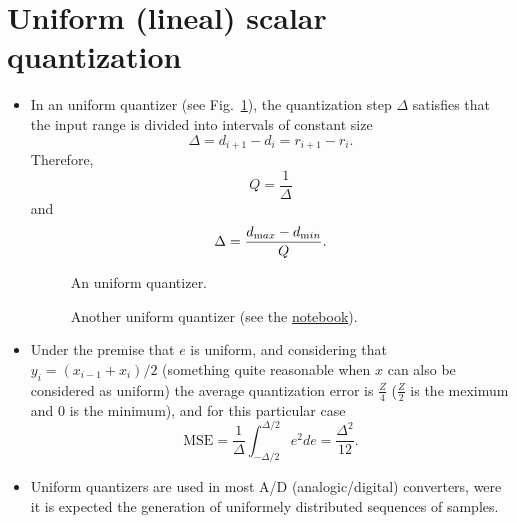 \section{Uniform (lineal) scalar quantization}
\begin{itemize}

\item
  In an uniform quantizer (see Fig.~\ref{fig:cuantif}), the
  quantization step \(\Delta\) satisfies that the input range is
  divided into intervals of constant size
  \begin{equation}
    \Delta=d_{i+1}-d_i=r_{i+1}-r_i.
  \end{equation}
  Therefore,
  \begin{equation}
    Q=\frac{1}{\Delta}
  \end{equation}
  and
  \begin{equation}
    \Delta=\frac{d_{\text max}-d_{\text min}}{Q}.
  \end{equation}

  \begin{figure}
    \caption{An uniform quantizer.}
    \label{fig:cuantif}
  \end{figure}

  \begin{figure}
    \caption{Another uniform quantizer (see the
      \href{https://nbviewer.jupyter.org/github/vicente-gonzalez-ruiz/quantization/blob/master/uniform_quantization.ipynb}{notebook}).}
    \label{fig:another_uq}
  \end{figure}
  
\item
  Under the premise that $e$ is uniform, and considering that
  $y_i=(x_{i-1}+x_i)/2$ (something quite reasonable when $x$ can also be
  considered as uniform) the average quantization error is
  $\frac{Z}{4}$ ($\frac{Z}{2}$ is the meximum and $0$ is the minimum),
  and for this particular case
  \begin{equation}
    \text{MSE} =
    \frac{1}{\Delta}\int_{-\Delta/2}^{\Delta/2}e^2de=\frac{\Delta^2}{12}.
  \end{equation}
  
\item
  Uniform quantizers are used in most A/D (analogic/digital)
  converters, were it is expected the generation of uniformely
  distributed sequences of samples.

\end{itemize}

